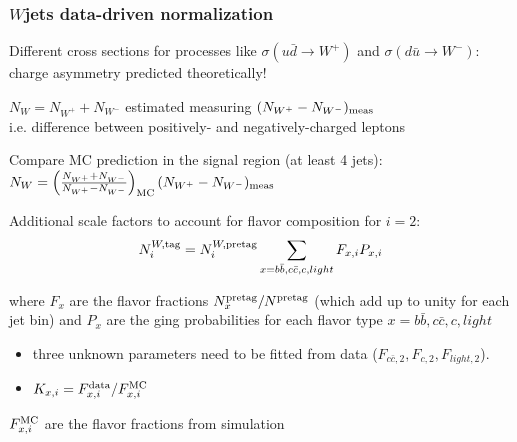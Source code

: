\begin{frame}\frametitle{$W$jets data-driven normalization}
\centering\scriptsize

Different 
cross sections for processes like
$\sigma(u\bar{d}\to W^+)$ and $\sigma(d\bar{u}\to W^-)$:\\
charge asymmetry predicted theoretically!

\myskip

$N_W=N_{W^+}+N_{W^-}$ estimated measuring $(N_{W^+}-N_{W^-})_{\rm meas}$ \\
i.e. difference between positively- and negatively-charged leptons

Compare MC prediction in the signal region (at least 4 jets):\\
$N_W = \left(\frac{N_{W^+}+N_{W^-}}{N_{W^+}-N_{W^-}}\right )_{\rm MC}(N_{W^+}-N_{W^-})_{\rm meas}$

\myskip 

Additional scale factors to account for flavor composition for $i=2$:
$$N^{W,{\rm tag}}_{i}  = 
N^{W,{\rm pretag}}_{i}
\sum_{x=b\bar{b}, c\bar{c}, c, light} F_{x,i}P_{x,i}$$

where $F_x$ are the flavor fractions $N^{\rm pretag}_x/N^{\rm pretag}$ 
(which add up to unity for each jet bin) and 
$P_x$ are the \btag ging probabilities for each flavor 
type $x = b\bar{b}, c\bar{c}, c, light$

\begin{itemize}
\item three unknown parameters need
to be fitted from data ($F_{c\bar{c},2}, F_{c,2}, F_{light,2}$).
\item $K_{x,i} = F^{\rm data}_{x,i}/F^{\rm MC}_{x,i}$
\end{itemize}
$F^{\rm MC}_{x,i}$ are the flavor fractions from simulation

\end{frame}




